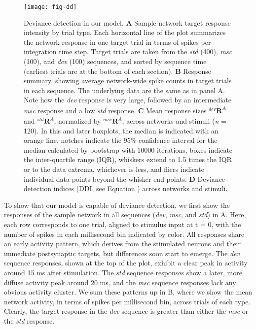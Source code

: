 \documentclass[9pt,lineno,onehalfspacing]{elife}
\newcommand{\dev}{\textit{dev}}
\newcommand{\msc}{\textit{msc}}
\newcommand{\std}{\textit{std}}
\newcommand{\R}[3][]{{}^{#1}_{}\boldsymbol R^{#2}_{#3}}
\newcommand{\mean}[1]{\overline{#1}}
\begin{document}
\begin{figure}
    \texttt{[image: fig-dd]}
    \caption{%
        Deviance detection in our model.
        \textbf{A} Sample network target response intensity by trial type. Each horizontal line of the plot summarizes the network response in one target trial in terms of spikes per integration time step. Target trials are taken from the \std{} (400), \msc{} (100), and \dev{} (100) sequences, and sorted by sequence time (earliest trials are at the bottom of each section).
        \textbf{B} Response summary, showing average network-wide spike counts in target trials in each sequence. The underlying data are the same as in panel A. Note how the \dev{} response is very large, followed by an intermediate \msc{} response and a low \std{} response.
        \textbf{C} Mean response sizes $\mean{\R[dev]{A}{}}$ and $\mean{\R[std]{A}{}}$, normalized by $\mean{\R[msc]{A}{}}$, across networks and stimuli (\textit{n} = 120). In this and later boxplots, the median is indicated with an orange line, notches indicate the 95\% confidence interval for the median calculated by bootstrap with 10000 iterations, boxes indicate the inter-quartile range (IQR), whiskers extend to 1.5 times the IQR or to the data extrema, whichever is less, and fliers indicate individual data points beyond the whisker end points.
        \textbf{D} Deviance detection indices (DDI, see Equation ) across networks and stimuli.
    }
    \label{fig:DD}
\end{figure}

To show that our model is capable of deviance detection, we first show the responses of the sample network in all sequences (\dev{}, \msc{}, and \std{}) in A. Here, each row corresponds to one trial, aligned to stimulus input at t = 0, with the number of spikes in each millisecond bin indicated by color. All responses share an early activity pattern, which derives from the stimulated neurons and their immediate postsynaptic targets, but differences soon start to emerge. The \dev{} sequence responses, shown at the top of the plot, exhibit a clear peak in activity around 15 ms after stimulation. The \std{} sequence responses show a later, more diffuse activity peak around 20 ms, and the \msc{} sequence responses lack any obvious activity cluster. We sum these patterns up in B, where we show the mean network activity, in terms of spikes per millisecond bin, across trials of each type. Clearly, the target response in the \dev{} sequence is greater than either the \msc{} or the \std{} response.
\end{document}
